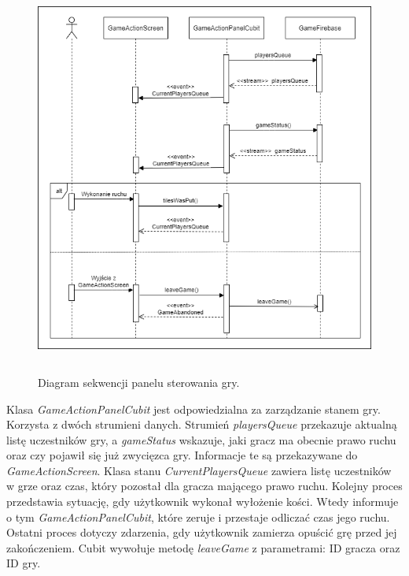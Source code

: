 \begin{figure}[h!]
	\begin{center}
		\includegraphics[width=14cm,height=13cm]{img/diagram-sekwencji-panel.png}
	\end{center}
	\caption{{\color{dgray}Diagram sekwencji panelu sterowania gry.}} 
	\label{GameActionPanelCubit}
\end{figure} 

Klasa \emph{GameActionPanelCubit} jest odpowiedzialna za zarządzanie stanem gry. Korzysta z dwóch strumieni danych. Strumień \emph{playersQueue} przekazuje aktualną listę uczestników gry, a \emph{gameStatus} wskazuje, jaki gracz ma obecnie prawo ruchu oraz czy pojawił się już zwycięzca gry. Informacje te są przekazywane do \emph{GameActionScreen}. Klasa stanu \emph{CurrentPlayersQueue} zawiera listę uczestników w grze oraz czas, który pozostał dla gracza mającego prawo ruchu. Kolejny proces przedstawia sytuację, gdy użytkownik wykonał wyłożenie kości. Wtedy informuje o tym \emph{GameActionPanelCubit}, które zeruje i przestaje odliczać czas jego ruchu. Ostatni proces dotyczy zdarzenia, gdy użytkownik zamierza opuścić grę przed jej zakończeniem. Cubit wywołuje metodę \emph{leaveGame} z parametrami: ID gracza oraz ID gry. \\ \\ \\ \\ \\ \\ \\ \\ \\ \\ \\

